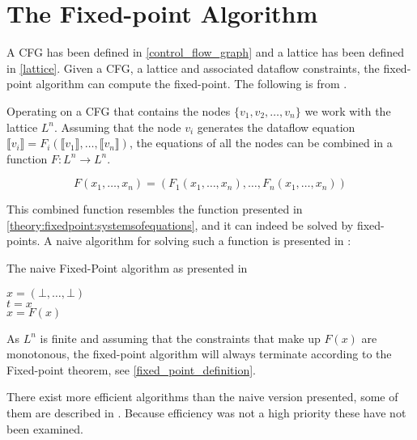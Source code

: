 \section{The Fixed-point Algorithm}\label{fixed_point_algorithm}
A CFG has been defined in \cref{control_flow_graph} and a lattice has been defined in \cref{lattice}.
Given a CFG, a lattice and associated dataflow constraints, the fixed-point algorithm can compute the fixed-point.
The following is from \citet{schwartzbach}.

Operating on a CFG that contains the nodes $\{ v_1, v_2, \dots, v_n \}$ we work with the lattice $L^n$.
Assuming that the node $v_i$ generates the dataflow equation $\llbracket v_i \rrbracket = F_i ( \llbracket v_1 \rrbracket, \dots, \llbracket v_n \rrbracket)$, the equations of all the nodes can be combined in a function $ F: L^n \rightarrow L^n$.

\[ F(x_1, \dots, x_n) = (F_1(x_1, \dots, x_n), \dots, F_n(x_1, \dots, x_n)) \]

This combined function resembles the function presented in \cref{theory:fixedpoint:systemsofequations}, and it can indeed be solved by fixed-points.
A naive algorithm for solving such a function is presented in \citet{schwartzbach}:

\begin{algorithm}
  \caption{The naive Fixed-Point algorithm as presented in \citet[p.18~]{schwartzbach}}\label{fixed-point_algo}  
  \DontPrintSemicolon
  $x = (\bot, \dots, \bot)$ \\
         {
           $t = x$\\
           $x = F(x)$
         }
\end{algorithm}

As $L^n$ is finite and assuming that the constraints that make up $F(x)$ are monotonous, the fixed-point algorithm will always terminate according to the Fixed-point theorem, see \cref{fixed_point_definition}.

There exist more efficient algorithms than the naive version presented, some of them are described in \citet[p.~18]{schwartzbach}.
Because efficiency was not a high priority these have not been examined.
